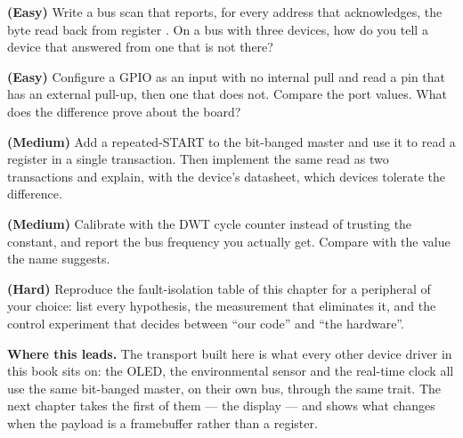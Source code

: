 \begin{exercises}
    \item \textbf{(Easy)} Write a bus scan that reports, for every address that acknowledges,
          the byte read back from register . On a bus with three devices,
          how do you tell a device that answered from one that is not there?
    \item \textbf{(Easy)} Configure a GPIO as an input with no internal pull and read a pin
          that has an external pull-up, then one that does not. Compare the port values.
          What does the difference prove about the board?
    \item \textbf{(Medium)} Add a repeated-START to the bit-banged master and use it to read a
          register in a single transaction. Then implement the same read as two transactions
          and explain, with the device's datasheet, which devices tolerate the difference.
    \item \textbf{(Medium)} Calibrate  with the DWT cycle
          counter instead of trusting the constant, and report the bus frequency you actually
          get. Compare with the value the name suggests.
    \item \textbf{(Hard)} Reproduce the fault-isolation table of this chapter for a peripheral
          of your choice: list every hypothesis, the measurement that eliminates it, and the
          control experiment that decides between ``our code'' and ``the hardware''.
\end{exercises}

\begin{notebox}
    \textbf{Where this leads.} The transport built here is what every other device driver in
    this book sits on: the OLED, the environmental sensor and the real-time clock all use the
    same bit-banged master, on their own bus, through the same 
    trait. The next chapter takes the first of them — the display — and shows what changes
    when the payload is a framebuffer rather than a register.
\end{notebox}
